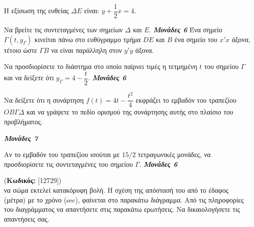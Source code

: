 \documentclass[11pt,a4paper,twoside]{book}
\newcounter{askhsh}[chapter]
\renewcommand{\theaskhsh}{
	\bf{\titlefont{\Large{\thechapter}}.\arabic{askhsh}}
}
\newcommand{\Askhsh}[2]{\refstepcounter{askhsh}{\titlefont{Άσκηση\theaskhsh} - \textcolor{maincolor}{ΘΕΜΑ #2}} (\small{\textbf{Κωδικός:} #1})\\}{}
\newcommand{\monades}[1]{
\hspace*{\fill}
\textbf{\textit{\textcolor{maincolor}{Μονάδες #1}}}}
\begin{document}
Η εξίσωση της ευθείας $\varDelta E$ είναι: $y + \dfrac{1}{2}x = 4$.
\begin{alist}
\item Να βρείτε τις συντεταγμένες των σημείων $\varDelta$ και $E$. \monades{6}
Ένα σημείο $\Gamma(t, y_\Gamma)$ κινείται πάνω στο ευθύγραμμο τμήμα $DE$ και $B$ ένα σημείο του $x'x$ άξονα, τέτοιο ώστε $\Gamma B$ να είναι παράλληλη στον $y'y$ άξονα.
\item Να προσδιορίσετε το διάστημα στο οποίο παίρνει τιμές η τετμημένη $t$ του σημείου $\Gamma$ και να δείξετε ότι $y_\Gamma = 4 - \dfrac{t}{2}$. \monades{6}
\item Να δείξετε ότι η συνάρτηση $f(t) = 4t - \dfrac{t^2}{4}$ εκφράζει το εμβαδόν του τραπεζίου $OB\Gamma\varDelta$ και να γράψετε το πεδίο ορισμού της συνάρτησης αυτής στο πλαίσιο του προβλήματος.

\monades{7}
\item Αν το εμβαδόν του τραπεζίου ισούται με $15/2$ τετραγωνικές μονάδες, να προσδιορίσετε τις συντεταγμένες του σημείου $\Gamma$. \monades{6}
\end{alist}

\vspace{4mm}

\Askhsh{[12729]}
Ένα σώμα εκτελεί κατακόρυφη βολή. Η σχέση της απόστασή του από το έδαφος (μέτρα) με το χρόνο (sec), φαίνεται στο παρακάτω διάγραμμα. Από τις πληροφορίες του διαγράμματος να απαντήσετε στις παρακάτω ερωτήσεις. Να δικαιολογήσετε τις απαντήσεις σας.
\begin{marginfigure}[-1cm]
\end{marginfigure}
\end{document}
